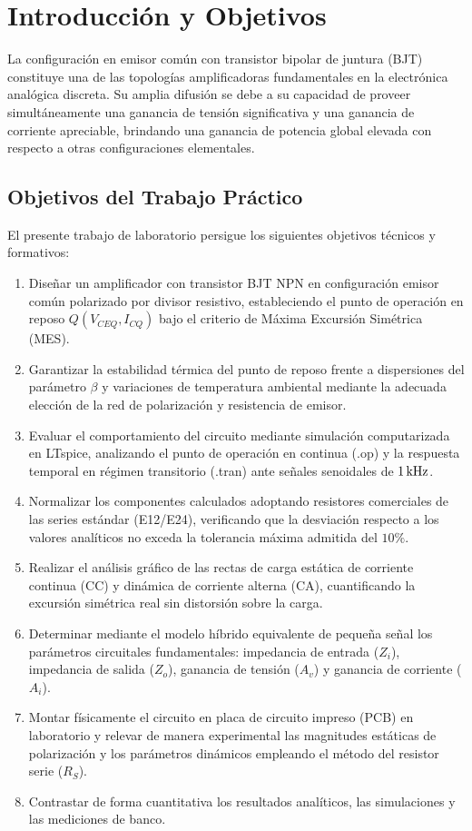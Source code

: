 \chapter{Introducción y Objetivos}
\label{chap:introduccion}

La configuración en emisor común con transistor bipolar de juntura (BJT) constituye una de las topologías
amplificadoras fundamentales en la electrónica analógica discreta. Su amplia difusión se debe a su capacidad
de proveer simultáneamente una ganancia de tensión significativa y una ganancia de corriente apreciable,
brindando una ganancia de potencia global elevada con respecto a otras configuraciones elementales.

\section{Objetivos del Trabajo Práctico}

El presente trabajo de laboratorio persigue los siguientes objetivos técnicos y formativos:
\begin{enumerate}
  \item Diseñar un amplificador con transistor BJT NPN en configuración emisor común polarizado por divisor resistivo,
    estableciendo el punto de operación en reposo $Q(V_{CEQ}, I_{CQ})$ bajo el criterio de Máxima Excursión Simétrica (MES).
  \item Garantizar la estabilidad térmica del punto de reposo frente a dispersiones del parámetro $\beta$ y variaciones
    de temperatura ambiental mediante la adecuada elección de la red de polarización y resistencia de emisor.
  \item Evaluar el comportamiento del circuito mediante simulación computarizada en LTspice, analizando el punto de
    operación en continua (.op) y la respuesta temporal en régimen transitorio (.tran) ante señales senoidales de $1\,\mathrm{kHz}$.
  \item Normalizar los componentes calculados adoptando resistores comerciales de las series estándar (E12/E24),
    verificando que la desviación respecto a los valores analíticos no exceda la tolerancia máxima admitida del $10\%$.
  \item Realizar el análisis gráfico de las rectas de carga estática de corriente continua (CC) y dinámica de corriente
    alterna (CA), cuantificando la excursión simétrica real sin distorsión sobre la carga.
  \item Determinar mediante el modelo híbrido equivalente de pequeña señal los parámetros circuitales fundamentales:
    impedancia de entrada ($Z_i$), impedancia de salida ($Z_o$), ganancia de tensión ($A_v$) y ganancia de corriente ($A_i$).
  \item Montar físicamente el circuito en placa de circuito impreso (PCB) en laboratorio y relevar de manera experimental
    las magnitudes estáticas de polarización y los parámetros dinámicos empleando el método del resistor serie ($R_S$).
  \item Contrastar de forma cuantitativa los resultados analíticos, las simulaciones y las mediciones de banco.
\end{enumerate}

